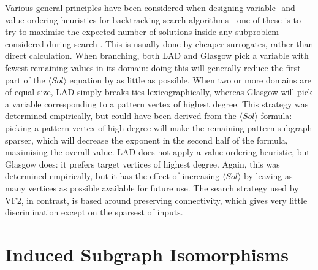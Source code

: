 \documentclass[twoside,11pt]{article}
\newcommand{\citep}[1]{\cite{#1}}
\begin{document}
Various general principles have been considered when designing variable- and value-ordering
heuristics for backtracking search algorithms---one of these is to try to maximise the expected
number of solutions inside any subproblem considered during search \citep{DBLP:conf/cp/GentMPSW96}.
This is usually done by cheaper surrogates, rather than direct calculation. When branching, both LAD
and Glasgow pick a variable with fewest remaining values in its domain: doing this will generally
reduce the first part of the $\langle Sol \rangle$ equation by as little as possible. When two or
more domains are of equal size, LAD simply breaks ties lexicographically, whereas Glasgow will pick
a variable corresponding to a pattern vertex of highest degree. This strategy was determined
empirically, but could have been derived from the $\langle Sol \rangle$ formula: picking a pattern
vertex of high degree will make the remaining pattern subgraph sparser, which will decrease the
exponent in the second half of the formula, maximising the overall value. LAD does not apply a
value-ordering heuristic, but Glasgow does: it prefers target vertices of highest degree.  Again, this was
determined empirically, but it has the effect of increasing $\langle Sol \rangle$ by leaving as many
vertices as possible available for future use. The search strategy used by VF2, in contrast, is
based around preserving connectivity, which gives very little discrimination except on the sparsest
of inputs.

\section{Induced Subgraph Isomorphisms}\label{section:induced}
\end{document}
